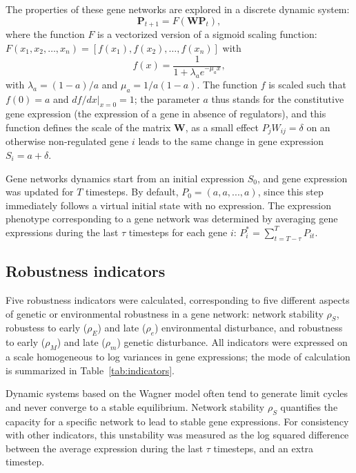 \documentclass[10pt,a4paper]{article}
\newcommand{\stability}{{\rho_S}}
\newcommand{\earlyenv}{{\rho_E}}
\newcommand{\lateenv}{{\rho_e}}
\newcommand{\earlymut}{{\rho_M}}
\newcommand{\latemut}{{\rho_m}}
\begin{document}
The properties of these gene networks are explored in a discrete dynamic system:
\begin{equation}
 \bm P_{t+1} = F(\bm W \bm P_t),
\end{equation}
\noindent where the function $F$ is a vectorized version of a sigmoid scaling function: $F(x_1, x_2, \dots, x_n) = [f(x_1), f(x_2), \dots, f(x_n)]$ with
\begin{equation} \label{eq:fx}
f(x) = \frac{1}{1+ \lambda_a e ^{- \mu_a x}}, 
\end{equation}
\noindent with $\lambda_a = (1-a)/a$ and $\mu_a = 1/a(1-a)$. The function $f$ is scaled such that $f(0) = a$ and $df/dx|_{x=0}=1$; the parameter $a$ thus stands for the constitutive gene expression (the expression of a gene in absence of regulators), and this function defines the scale of the matrix $\bm W$, as a small effect $P_j W_{ij} = \delta$ on an otherwise non-regulated gene $i$ leads to the same change in gene expression $S_i = a+\delta$. 

Gene networks dynamics start from an initial expression $S_0$, and gene expression was updated for $T$ timesteps. By default, $P_0 = (a, a, ..., a)$, since this step immediately follows a virtual initial state with no expression. The expression phenotype corresponding to a gene network was determined by averaging gene expressions during the last $\tau$ timesteps for each gene $i$: $P_i^* = \sum_{t=T-\tau}^T P_{it}$. 

\subsection{Robustness indicators}

Five robustness indicators were calculated, corresponding to five different aspects of genetic or environmental robustness in a gene network: network stability $\stability$, robustess to early ($\earlyenv$) and late ($\lateenv$) environmental disturbance, and robustness to early ($\earlymut$) and late ($\latemut$) genetic disturbance. All indicators were expressed on a scale homogeneous to log variances in gene expressions; the mode of calculation is summarized in Table~\ref{tab:indicators}. 

Dynamic systems based on the Wagner model often tend to generate limit cycles and never converge to a stable equilibrium. Network stability $\stability$ quantifies the capacity for a specific network to lead to stable gene expressions.  For consistency with other indicators, this unstability was measured as the log squared difference between the average expression during the last $\tau$ timesteps, and an extra timestep. 
\end{document}
